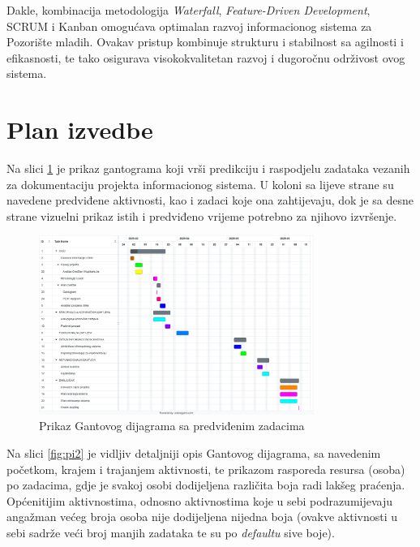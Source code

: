 Dakle, kombinacija metodologija \textit{Waterfall}, \textit{Feature-Driven Development}, SCRUM i Kanban omogućava optimalan razvoj informacionog sistema za Pozorište mladih. Ovakav pristup kombinuje strukturu i stabilnost sa agilnosti i efikasnosti, te tako osigurava visokokvalitetan razvoj i dugoročnu održivost ovog sistema.

\sloppy

\section{Plan izvedbe}
\label{izvedba}
Na slici \ref{fig:pi1} je prikaz gantograma koji vrši predikciju i raspodjelu zadataka vezanih za dokumentaciju projekta informacionog sistema. U koloni sa lijeve strane su navedene predviđene aktivnosti, kao i zadaci koje ona zahtijevaju, dok je sa desne strane vizuelni prikaz istih i predviđeno vrijeme potrebno za njihovo izvršenje.

\begin{figure}[H]
    \centering
    \includegraphics[width=0.8\textwidth]{Slike/gantogram.png}
    \caption{Prikaz Gantovog dijagrama sa predviđenim zadacima}
    \label{fig:pi1}
\end{figure}

Na slici \ref{fig:pi2} je vidljiv detaljniji opis Gantovog dijagrama, sa navedenim početkom, krajem i trajanjem aktivnosti, te prikazom rasporeda resursa (osoba) po zadacima, gdje je svakoj osobi dodijeljena različita boja radi lakšeg praćenja. Općenitijim aktivnostima, odnosno aktivnostima koje u sebi podrazumijevaju angažman većeg broja osoba nije dodijeljena nijedna boja (ovakve aktivnosti u sebi sadrže veći broj manjih zadataka te su po \textit{defaultu} sive boje). 

